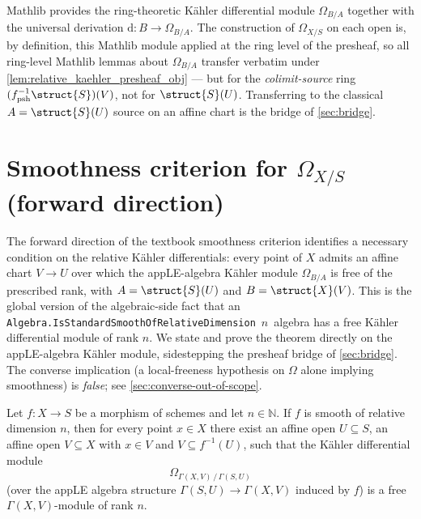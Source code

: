 \begin{remark}
  \label{rem:kahler_compatibility}
  Mathlib provides the ring-theoretic K\"ahler differential module \(\Omega_{B/A}\) together with the universal derivation \(\mathrm{d} \colon B \to \Omega_{B/A}\). The construction of \(\Omega_{X/S}\) on each open is, by definition, this Mathlib module applied at the ring level of the presheaf, so all ring-level Mathlib lemmas about \(\Omega_{B/A}\) transfer verbatim under \cref{lem:relative_kaehler_presheaf_obj} — but for the \emph{colimit-source} ring \((f^{-1}_{\mathrm{psh}}\struct{S})(V)\), not for \(\struct{S}(U)\). Transferring to the classical \(A = \struct{S}(U)\) source on an affine chart is the bridge of \cref{sec:bridge}.
\end{remark}

\section{Smoothness criterion for \(\Omega_{X/S}\) (forward direction)}

The forward direction of the textbook smoothness criterion identifies a necessary condition on the relative K\"ahler differentials: every point of \(X\) admits an affine chart \(V \to U\) over which the appLE-algebra K\"ahler module \(\Omega_{B/A}\) is free of the prescribed rank, with \(A = \struct{S}(U)\) and \(B = \struct{X}(V)\). This is the global version of the algebraic-side fact that an \texttt{Algebra.IsStandardSmoothOfRelativeDimension}~\(n\)~algebra has a free K\"ahler differential module of rank \(n\). We state and prove the theorem directly on the appLE-algebra K\"ahler module, sidestepping the presheaf bridge of \cref{sec:bridge}. The converse implication (a local-freeness hypothesis on \(\Omega\) alone implying smoothness) is \emph{false}; see \cref{sec:converse-out-of-scope}.

\begin{theorem}
  \label{thm:smooth_locally_free_omega}
  
  Let \(f \colon X \to S\) be a morphism of schemes and let \(n \in \mathbb{N}\). If \(f\) is smooth of relative dimension \(n\), then for every point \(x \in X\) there exist an affine open \(U \subseteq S\), an affine open \(V \subseteq X\) with \(x \in V\) and \(V \subseteq f^{-1}(U)\), such that the K\"ahler differential module
  \[
    \Omega_{\Gamma(X, V) \,/\, \Gamma(S, U)}
  \]
  (over the appLE algebra structure \(\Gamma(S, U) \to \Gamma(X, V)\) induced by \(f\)) is a free \(\Gamma(X, V)\)-module of rank \(n\).
\end{theorem}

